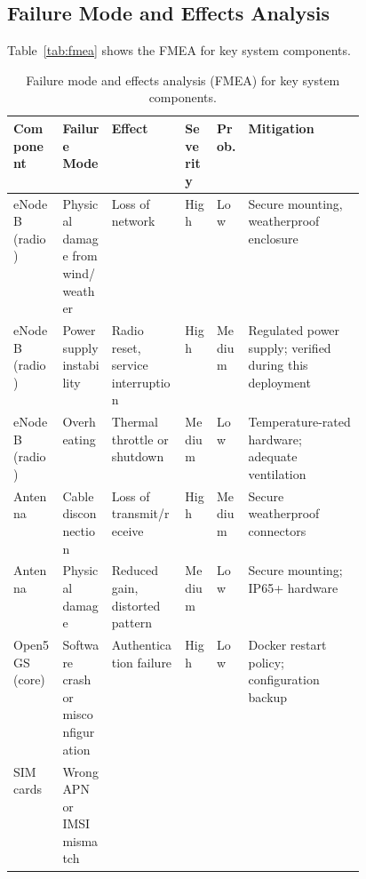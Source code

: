 \documentclass[
    left=1.5in,
    right=1.25in,
    top=1.25in,
    bottom=1.25in
]{CalPolySeniorProject}
\begin{document}
\subsection{Failure Mode and Effects Analysis}

Table~\ref{tab:fmea} shows the FMEA for key system components.

\begin{table}[!ht]
    \centering
    \caption[Failure mode and effects analysis]{Failure mode and effects
    analysis (FMEA) for key system components.}
    \vspace{0.5\baselineskip}
    {\small
    \begin{tabularx}{\linewidth}{%
        >{\raggedright\arraybackslash}p{0.14\linewidth}
        >{\raggedright\arraybackslash}p{0.14\linewidth}
        >{\raggedright\arraybackslash}X
        >{\raggedright\arraybackslash}p{0.09\linewidth}
        >{\raggedright\arraybackslash}p{0.09\linewidth}
        >{\raggedright\arraybackslash}X}
        \toprule
        \textbf{Component} & \textbf{Failure Mode} & \textbf{Effect}
            & \textbf{Severity} & \textbf{Prob.} & \textbf{Mitigation} \\
        \midrule
        eNodeB (radio) & Physical damage from wind/weather
            & Loss of network & High & Low
            & Secure mounting, weatherproof enclosure \\
        \addlinespace
        eNodeB (radio) & Power supply instability
            & Radio reset, service interruption & High & Medium
            & Regulated power supply; verified during this deployment \\
        \addlinespace
        eNodeB (radio) & Overheating
            & Thermal throttle or shutdown & Medium & Low
            & Temperature-rated hardware; adequate ventilation \\
        \addlinespace
        Antenna & Cable disconnection
            & Loss of transmit/receive & High & Medium
            & Secure weatherproof connectors \\
        \addlinespace
        Antenna & Physical damage
            & Reduced gain, distorted pattern & Medium & Low
            & Secure mounting; IP65+ hardware \\
        \addlinespace
        Open5GS (core) & Software crash or misconfiguration
            & Authentication failure & High & Low
            & Docker restart policy; configuration backup \\
        \addlinespace
        SIM cards & Wrong APN or IMSI mismatch

\end{tabularx}}
\end{table}
\end{document}
